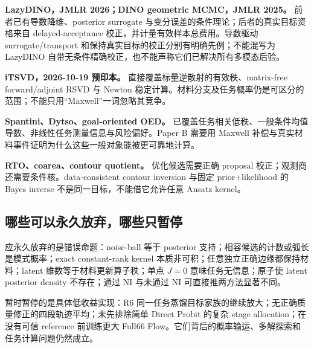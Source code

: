 \textbf{LazyDINO，JMLR 2026；DINO geometric MCMC，JMLR 2025。} 前者已有导数降维、posterior surrogate 与变分误差的条件理论；后者的真实目标资格来自 delayed-acceptance 校正，并计量有效样本总费用。导数驱动 surrogate/transport 和保持真实目标的校正分别有明确先例；不能混写为 LazyDINO 自带无条件精确校正，也不能声称它们已解决所有多模态后验。

\textbf{iTSVD，2026-10-19 预印本。} 直接覆盖标量逆散射的有效秩、matrix-free forward/adjoint RSVD 与 Newton 稳定计算。材料分支及任务概率仍是可区分的范围；不能只用“Maxwell”一词忽略其竞争。

\textbf{Spantini、Dytso、goal-oriented OED。} 已覆盖任务相关低秩、一般条件均值导数、非线性任务测量信息与风险偏好。Paper B 需要用 Maxwell 补偿与真实材料事件证明为什么这些一般对象能被更可靠地计算。

\textbf{RTO、coarea、contour quotient。} 优化候选需要正确 proposal 校正；观测商还需要条件核。data-consistent contour inversion 与固定 prior+likelihood 的 Bayes inverse 不是同一目标，不能借它允许任意 Ansatz kernel。

\subsection{哪些可以永久放弃，哪些只暂停}
应永久放弃的是错误命题：noise-ball 等于 posterior 支持；相容候选的计数或弧长是模式概率；exact constant-rank kernel 本质非可积；任意独立正确边缘都保持材料；latent 维数等于材料更新算子秩；单点 $J=0$ 意味任务无信息；原子使 latent posterior density 不存在；通过 NI 与未通过 NI 可直接推两方法显著不同。

暂时暂停的是具体低收益实现：R6 同一任务蒸馏目标家族的继续放大；无正确质量修正的四段轨迹平均；未先排除简单 Direct Probit 的复杂 stage allocation；在没有可信 reference 前训练更大 Full66 Flow。它们背后的概率输运、多解探索和任务计算问题仍然成立。

